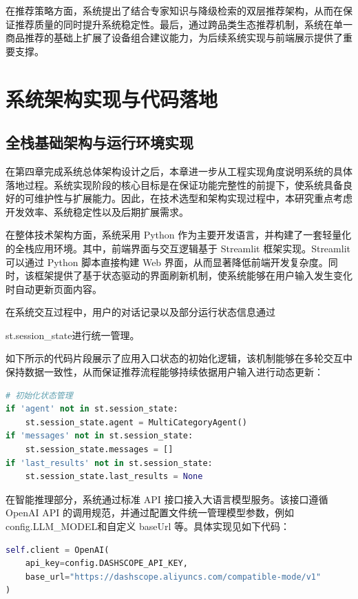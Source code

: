 \documentclass{nkuthesis}
\begin{document}
在推荐策略方面，系统提出了结合专家知识与降级检索的双层推荐架构，从而在保证推荐质量的同时提升系统稳定性。最后，通过跨品类生态推荐机制，系统在单一商品推荐的基础上扩展了设备组合建议能力，为后续系统实现与前端展示提供了重要支撑。

\section{系统架构实现与代码落地}

\subsection{全栈基础架构与运行环境实现}

在第四章完成系统总体架构设计之后，本章进一步从工程实现角度说明系统的具体落地过程。系统实现阶段的核心目标是在保证功能完整性的前提下，使系统具备良好的可维护性与扩展能力。因此，在技术选型和架构实现过程中，本研究重点考虑开发效率、系统稳定性以及后期扩展需求。

在整体技术架构方面，系统采用 Python 作为主要开发语言，并构建了一套轻量化的全栈应用环境。其中，前端界面与交互逻辑基于 Streamlit 框架实现。Streamlit 可以通过 Python 脚本直接构建 Web 界面，从而显著降低前端开发复杂度。同时，该框架提供了基于状态驱动的界面刷新机制，使系统能够在用户输入发生变化时自动更新页面内容。

在系统交互过程中，用户的对话记录以及部分运行状态信息通过 

st.session\_state进行统一管理。

如下所示的代码片段展示了应用入口状态的初始化逻辑，该机制能够在多轮交互中保持数据一致性，从而保证推荐流程能够持续依据用户输入进行动态更新：

\begin{lstlisting}[language=Python, caption={系统状态初始化（片段，摘自 app.py）}]
# 初始化状态管理
if 'agent' not in st.session_state:
    st.session_state.agent = MultiCategoryAgent()
if 'messages' not in st.session_state:
    st.session_state.messages = []
if 'last_results' not in st.session_state:
    st.session_state.last_results = None
\end{lstlisting}

在智能推理部分，系统通过标准 API 接口接入大语言模型服务。该接口遵循 OpenAI API 的调用规范，并通过配置文件统一管理模型参数，例如 config.LLM\_MODEL和自定义 baseUrl 等。具体实现见如下代码：

\begin{lstlisting}[language=Python, caption={大语言模型客户端初始化（片段，摘自 base\_agent.py）}]
self.client = OpenAI(
    api_key=config.DASHSCOPE_API_KEY,
    base_url="https://dashscope.aliyuncs.com/compatible-mode/v1"
)
\end{lstlisting}
\end{document}
